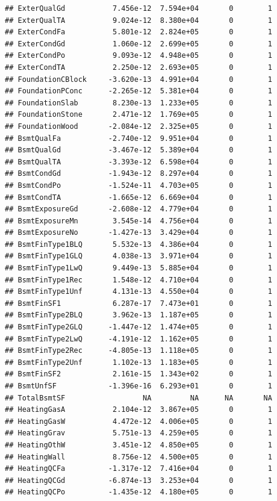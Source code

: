 \documentclass[
]{article}
\begin{document}
\begin{verbatim}
## ExterQualGd           7.456e-12  7.594e+04       0        1
## ExterQualTA           9.024e-12  8.380e+04       0        1
## ExterCondFa           5.801e-12  2.824e+05       0        1
## ExterCondGd           1.060e-12  2.699e+05       0        1
## ExterCondPo           9.093e-12  4.948e+05       0        1
## ExterCondTA           2.250e-12  2.693e+05       0        1
## FoundationCBlock     -3.620e-13  4.991e+04       0        1
## FoundationPConc      -2.265e-12  5.381e+04       0        1
## FoundationSlab        8.230e-13  1.233e+05       0        1
## FoundationStone       2.471e-12  1.769e+05       0        1
## FoundationWood       -2.084e-12  2.325e+05       0        1
## BsmtQualFa           -2.740e-12  9.951e+04       0        1
## BsmtQualGd           -3.467e-12  5.389e+04       0        1
## BsmtQualTA           -3.393e-12  6.598e+04       0        1
## BsmtCondGd           -1.943e-12  8.297e+04       0        1
## BsmtCondPo           -1.524e-11  4.703e+05       0        1
## BsmtCondTA           -1.665e-12  6.669e+04       0        1
## BsmtExposureGd       -2.608e-12  4.779e+04       0        1
## BsmtExposureMn        3.545e-14  4.756e+04       0        1
## BsmtExposureNo       -1.427e-13  3.429e+04       0        1
## BsmtFinType1BLQ       5.532e-13  4.386e+04       0        1
## BsmtFinType1GLQ       4.038e-13  3.971e+04       0        1
## BsmtFinType1LwQ       9.449e-13  5.885e+04       0        1
## BsmtFinType1Rec       1.548e-12  4.710e+04       0        1
## BsmtFinType1Unf       4.131e-13  4.550e+04       0        1
## BsmtFinSF1            6.287e-17  7.473e+01       0        1
## BsmtFinType2BLQ       3.962e-13  1.187e+05       0        1
## BsmtFinType2GLQ      -1.447e-12  1.474e+05       0        1
## BsmtFinType2LwQ      -4.191e-12  1.162e+05       0        1
## BsmtFinType2Rec      -4.805e-13  1.118e+05       0        1
## BsmtFinType2Unf       1.102e-13  1.183e+05       0        1
## BsmtFinSF2            2.161e-15  1.343e+02       0        1
## BsmtUnfSF            -1.396e-16  6.293e+01       0        1
## TotalBsmtSF                  NA         NA      NA       NA
## HeatingGasA           2.104e-12  3.867e+05       0        1
## HeatingGasW           4.472e-12  4.006e+05       0        1
## HeatingGrav           5.751e-13  4.259e+05       0        1
## HeatingOthW           3.451e-12  4.850e+05       0        1
## HeatingWall           8.756e-12  4.500e+05       0        1
## HeatingQCFa          -1.317e-12  7.416e+04       0        1
## HeatingQCGd          -6.874e-13  3.253e+04       0        1
## HeatingQCPo          -1.435e-12  4.180e+05       0        1

\end{verbatim}
\end{document}
